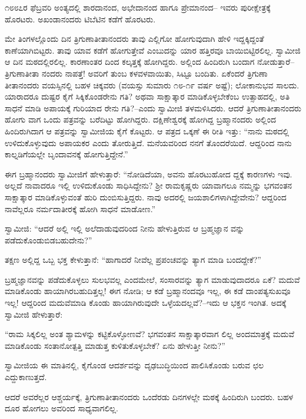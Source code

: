೧೮೮೭ರ ಫೆಬ್ರವರಿ ಅಂತ್ಯದಲ್ಲಿ ಶಾರದಾನಂದ, ಅಭೇದಾನಂದ ಹಾಗೂ ಪ್ರೇಮಾನಂದ– ಇವರು ಪುರೀಕ್ಷೇತ್ರಕ್ಕೆ ಹೊರಟರು. ಅಖಂಡಾನಂದರು ಟಿಬೆಟಿನ ಕಡೆಗೆ ಹೊರಟರು.

ಮೇ ತಿಂಗಳಲ್ಲೊಂದು ದಿನ ತ್ರಿಗುಣಾತೀತಾನಂದರು ತಾವು ಎಲ್ಲಿಗೋ ಹೋಗುವುದಾಗಿ ಹೇಳಿ ಇದ್ದಕ್ಕಿದ್ದಂತೆ ಕಾಣೆಯಾಗಿಬಿಟ್ಟರು. ತಾವು ಯಾವ ಕಡೆಗೆ ಹೋಗುತ್ತೇವೆ ಎಂಬುದನ್ನು ಯಾರ ಹತ್ತಿರವೂ ಬಾಯಿಬಿಟ್ಟಿರಲಿಲ್ಲ. ಸ್ವಾಮೀಜಿ ಆ ದಿನ ಮಠದಲ್ಲಿರಲಿಲ್ಲ. ಕಾರಣಾಂತರ ದಿಂದ ಕಲ್ಕತ್ತಕ್ಕೆ ಹೋಗಿದ್ದರು. ಅಲ್ಲಿಂದ ಹಿಂದಿರುಗಿ ಬಂದಾಗ ನೋಡುತ್ತಾರೆ–ತ್ರಿಗುಣಾತೀತಾ ನಂದರು ನಾಪತ್ತೆ! ಅವರಿಗೆ ತುಂಬ ಕಳವಳವಾಯಿತು, ಸಿಟ್ಟೂ ಬಂದಿತು. ಏಕೆಂದರೆ ತ್ರಿಗುಣಾ ತೀತಾನಂದರು ವಯಸ್ಸಿನಲ್ಲಿ ಬಹಳ ಚಿಕ್ಕವರು (ವಯಸ್ಸು ಸುಮಾರು ೧೮-೧೯ ವರ್ಷ ಅಷ್ಟೆ); ಲೋಕಾನುಭವ ಸಾಲದು. ಯಾರಾದರೂ ದುಷ್ಟರ ಕೈಗೆ ಸಿಕ್ಕಿಕೊಂಡರೇನು ಗತಿ? ಅಥವಾ ಸಾಕ್ಷಾತ್ಕಾರ ಮಾಡಿಕೊಳ್ಳಬೇಕೆಂಬ ಉತ್ಸಾಹದಲ್ಲಿ, ಅತಿ ಸಾಧನೆ ಮಾಡಿ ಅಪಾಯಕ್ಕೆ ಗುರಿಯಾದ ರೇನು ಗತಿ?–ಎಂದು ಸ್ವಾಮೀಜಿ ತಳಮಳಿಸಿದರು. ಆದರೆ ತ್ರಿಗುಣಾತೀತಾನಂದರು ಹೋಗು ವಾಗ ಒಂದು ಪತ್ರವನ್ನು ಬರೆದಿಟ್ಟು ಹೋಗಿದ್ದರು. ದಕ್ಷಿಣೇಶ್ವರಕ್ಕೆ ಹೋಗಿದ್ದ ಬ್ರಹ್ಮಾನಂದರು ಅಲ್ಲಿಂದ ಹಿಂದಿರುಗಿದಾಗ ಆ ಪತ್ರವನ್ನು ಸ್ವಾಮೀಜಿಯ ಕೈಗೆ ಕೊಟ್ಟರು. ಆ ಪತ್ರದ ಒಕ್ಕಣೆ ಈ ರೀತಿ ಇತ್ತು: “ನಾನು ಮಠದಲ್ಲಿ ಉಳಿದುಕೊಳ್ಳುವುದು ಅಪಾಯಕರ ಎಂದು ತೋರುತ್ತಿದೆ. ಮನೆಯವರಿಂದ ನನಗೆ ತೊಂದರೆಯಿದೆ. ಆದ್ದರಿಂದ ನಾನು ಕಾಲ್ನಡಿಗೆಯಲ್ಲೇ ಬೃಂದಾವನಕ್ಕೆ ಹೋಗುತ್ತಿದ್ದೇನೆ.”

ಈಗ ಬ್ರಹ್ಮಾನಂದರು ಸ್ವಾಮೀಜಿಗೆ ಹೇಳುತ್ತಾರೆ: “ನೋಡಿದೆಯಾ, ಅವನು ಹೊರಟುಹೋದ ದ್ದಕ್ಕೆ ಕಾರಣಗಳು ಇವು. ಅಲ್ಲದೆ ನಾವಾದರೂ ಇಲ್ಲಿ ಉಳಿದುಕೊಂಡು ಸಾಧಿಸಿದ್ದೇನು? ಶ್ರೀ ರಾಮಕೃಷ್ಣರು ಯಾವಾಗಲೂ ನಮ್ಮನ್ನು ಭಗವಂತನ ಸಾಕ್ಷಾತ್ಕಾರ ಮಾಡಿಕೊಳ್ಳುವಂತೆ ಹುರಿ ದುಂಬಿಸುತ್ತಿದ್ದರು. ನಾವು ಅದರಲ್ಲಿ ಜಯಶಾಲಿಗಳಾಗಿದ್ದೇವೇನು? ಆದ್ದರಿಂದ ನಾವೆಲ್ಲರೂ ನರ್ಮದಾತೀರಕ್ಕೆ ಹೋಗಿ ಸಾಧನೆ ಮಾಡೋಣ.”

ಸ್ವಾಮೀಜಿ: “ಆದರೆ ಅಲ್ಲಿ ಇಲ್ಲಿ ಅಲೆದಾಡುವುದರಿಂದ ನೀನು ಹೇಳುತ್ತಿರುವ ಆ ಬ್ರಹ್ಮಜ್ಞಾನ ವನ್ನು ಪಡೆದುಕೊಂಡುಬಿಡಬಹುದೇನು?”

ತಕ್ಷಣ ಅಲ್ಲಿದ್ದ ಒಬ್ಬ ಭಕ್ತ ಕೇಳುತ್ತಾನೆ: “ಹಾಗಾದರೆ ನೀವೆಲ್ಲ ಪ್ರಪಂಚವನ್ನು ತ್ಯಾಗ ಮಾಡಿ ಬಂದದ್ದೇಕೆ?”

ಬ್ರಹ್ಮಜ್ಞಾನವನ್ನು ಪಡೆದುಕೊಳ್ಳಲು ಸುಲಭವಲ್ಲ ಎಂದಮೇಲೆ, ಸಂಸಾರವನ್ನು ತ್ಯಾಗ ಮಾಡುವುದಾದರೂ ಏಕೆ? ಮದುವೆ ಮಾಡಿಕೊಂಡು ಹಾಯಾಗಿರಬಹುದಿತ್ತಲ್ಲ! ಈಗ ನೋಡಿ; ಆ ಕಡೆ ಬ್ರಹ್ಮಾನಂದವೂ ಇಲ್ಲ, ಈ ಕಡೆ ದಾಂಪತ್ಯಸುಖವೂ ಇಲ್ಲ! ಆದ್ದರಿಂದ ಮದುವೆಮಾಡಿ ಕೊಂಡು ಹಾಯಾಗಿರುವುದೇ ಒಳ್ಳೆಯದಲ್ಲವೆ?–ಇದು ಆ ಭಕ್ತನ ಇಂಗಿತ. ಅದಕ್ಕೆ ಸ್ವಾಮೀಜಿ ಹೇಳುತ್ತಾರೆ:

“ರಾಮ ಸಿಕ್ಕಲಿಲ್ಲ ಅಂತ ಶ್ಯಾಮಳನ್ನು ಕಟ್ಟಿಕೊಳ್ಳೋಣವೆ? ಭಗವಂತನ ಸಾಕ್ಷಾತ್ಕಾರವಾಗ ಲಿಲ್ಲ ಅಂದಮಾತ್ರಕ್ಕೆ ಮದುವೆ ಮಾಡಿಕೊಂಡು ಸಂತಾನೋತ್ಪತ್ತಿ ಮಾಡುತ್ತ ಕುಳಿತುಕೊಳ್ಳಬೇಕೆ? ಏನು ಹೇಳುತ್ತೀ ನೀನು?”

ಸ್ವಾಮೀಜಿಯ ಈ ಮಾತಿನಲ್ಲಿ, ಕೈಗೊಂಡ ಆದರ್ಶವನ್ನು ದೃಢಬುದ್ಧಿಯಿಂದ ಪಾಲಿಸಿಕೊಂಡು ಬರುವ ಛಲ ಎದ್ದುಕಾಣುತ್ತದೆ.

ಆದರೆ ಅವರೆಲ್ಲರ ಆಶ್ಚರ್ಯಕ್ಕೆ, ತ್ರಿಗುಣಾತೀತಾನಂದರು ಒಂದೆರಡು ದಿನಗಳಲ್ಲೇ ಮಠಕ್ಕೆ ಹಿಂದಿರುಗಿ ಬಂದರು. ಬಹಳ ದೂರ ಹೋಗಲು ಅವರಿಂದ ಸಾಧ್ಯವಾಗಲಿಲ್ಲ.

